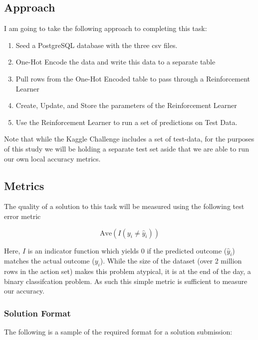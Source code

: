 \documentclass[]{report}
\begin{document}
\pagebreak

\subsection{Approach}\label{approach}

I am going to take the following approach to completing this task:

\begin{enumerate}
\def\labelenumi{\arabic{enumi}.}
\itemsep1pt\parskip0pt
\item
  Seed a PostgreSQL database with the three csv files.
\item
  One-Hot Encode the data and write this data to a separate table
\item
  Pull rows from the One-Hot Encoded table to pass through a
  Reinforcement Learner
\item
  Create, Update, and Store the parameters of the Reinforcement Learner
\item
  Use the Reinforcement Learner to run a set of predictions on Test
  Data.
\end{enumerate}

Note that while the Kaggle Challenge includes a set of test-data, for
the purposes of this study we will be holding a separate test set aside
that we are able to run our own local accuracy metrics.

\subsection{Metrics}\label{metrics}

The quality of a solution to this task will be measured using the
following test error metric

\[\text{Ave}(I(y_i\neq\hat{y}_i))\]

Here, $I$ is an indicator function which yields 0 if the predicted
outcome ($\hat{y}_i$) matches the actual outcome ($y_i$). While the size
of the dataset (over 2 million rows in the action set) makes this
problem atypical, it is at the end of the day, a binary classifcation
problem. As such this simple metric is sufficient to measure our
accuracy.

\subsubsection{Solution Format}\label{solution-format}

The following is a sample of the required format for a solution
submission:
\end{document}
